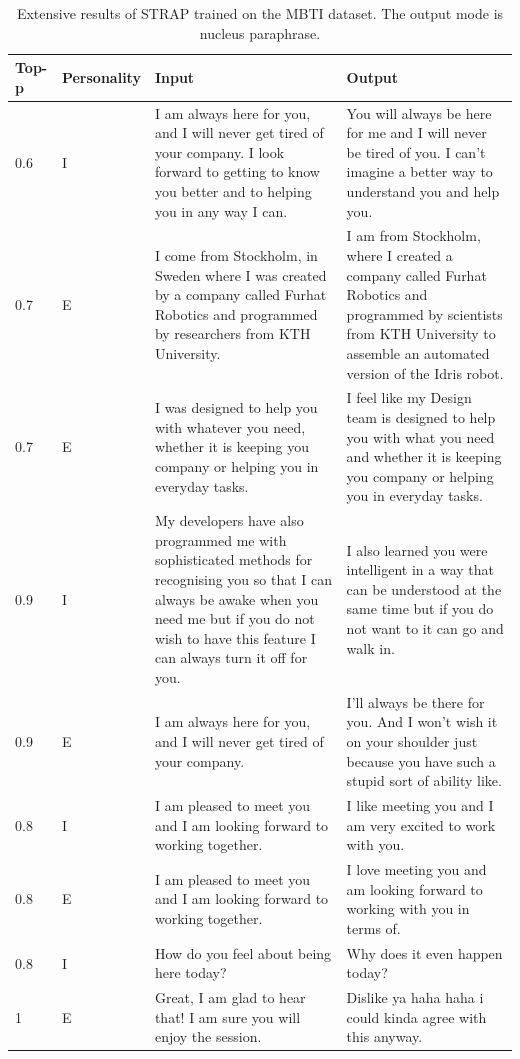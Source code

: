 \documentclass[nomenclature, english, biblatex]{kththesis}
\begin{document}
\begin{table}
    \centering
    \begin{adjustbox}{max width=\textwidth}
        \begin{tabular}{|p{}|p{}|p{}|p{}|}
        \hline
        Top-p & Personality & Input & Output \\
        \hline
        \hline
        0.6 & I & I am always here for you, and I will never get tired of your company. I look forward to getting to know you better and to helping you in any way I can. & You will always be here for me and I will never be tired of you. I can't imagine a better way to understand you and help you.\\
        \hline
        0.7 & E & I come from Stockholm, in Sweden where I was created by a company called Furhat Robotics and programmed by researchers from KTH University. & I am from Stockholm, where I created a company called Furhat Robotics and programmed by scientists from KTH University to assemble an automated version of the Idris robot.\\
        \hline
        0.7 & E & I was designed to help you with whatever you need, whether it is keeping you company or helping you in everyday tasks. & I feel like my Design team is designed to help you with what you need and whether it is keeping you company or helping you in everyday tasks.\\
        \hline
        0.9 & I & My developers have also programmed me with sophisticated methods for recognising you so that I can always be awake when you need me but if you do not wish to have this feature I can always turn it off for you. & I also learned you were intelligent in a way that can be understood at the same time but if you do not want to it can go and walk in.\\
        \hline
        0.9 & E & I am always here for you, and I will never get tired of your company. & I'll always be there for you. And I won't wish it on your shoulder just because you have such a stupid sort of ability like.\\
        \hline
        0.8 & I & I am pleased to meet you and I am looking forward to working together. & I like meeting you and I am very excited to work with you. \\
        \hline
        0.8 & E & I am pleased to meet you and I am looking forward to working together. & I love meeting you and am looking forward to working with you in terms of. \\
        \hline
        0.8 & I & How do you feel about being here today? & Why does it even happen today? \\
        \hline
        1 & E & Great, I am glad to hear that! I am sure you will enjoy the session. & Dislike ya haha haha i could kinda agree with this anyway.\\
        \hline
        \end{tabular}
    \end{adjustbox}
    \caption{Extensive results of STRAP trained on the MBTI dataset. The output mode is nucleus paraphrase.}
    \label{tab:strap_np_mbti_extensive}
\end{table}
\end{document}
